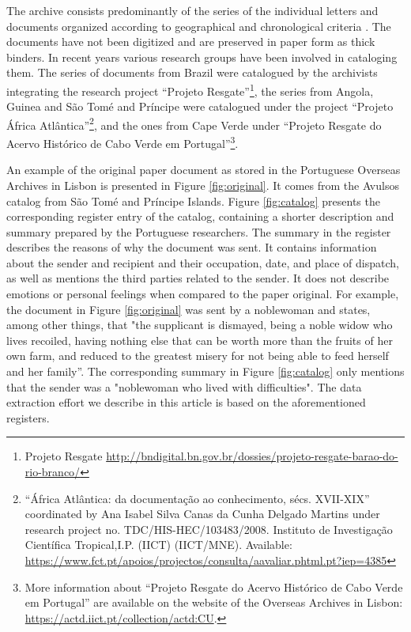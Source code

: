 \documentclass{article}
\begin{document}
The archive consists predominantly of the series of the individual letters and documents organized according to geographical and chronological criteria \cite{arquivo_historico_colonial_boletim_1950}. The documents have not been digitized and are preserved in paper form as thick binders. In recent years various research groups have been involved in cataloging them. The series of documents from Brazil were catalogued by the archivists integrating the research project ``Projeto Resgate''\footnote{Projeto Resgate \url{http://bndigital.bn.gov.br/dossies/projeto-resgate-barao-do-rio-branco/}}, the series from Angola, Guinea and São Tomé and Príncipe were catalogued under the project ``Projeto África Atlântica''\footnote{``África Atlântica: da documentação ao conhecimento, sécs. XVII-XIX'' coordinated by Ana Isabel Silva Canas da Cunha Delgado Martins under research project no. TDC/HIS-HEC/103483/2008. Instituto de Investigação Científica Tropical,I.P. (IICT) (IICT/MNE).  Available: \url{https://www.fct.pt/apoios/projectos/consulta/aavaliar.phtml.pt?iep=4385}}, and the ones from Cape Verde under ``Projeto Resgate do Acervo Histórico de Cabo Verde em Portugal''\footnote{More information about ``Projeto Resgate do Acervo Histórico de Cabo Verde em Portugal'' are available on the website of the Overseas Archives in Lisbon: \url{https://actd.iict.pt/collection/actd:CU}.}.

An example of the original paper document as stored in the Portuguese Overseas Archives in Lisbon is presented in Figure \ref{fig:original}. It comes from the Avulsos catalog from São Tomé and Príncipe Islands. Figure \ref{fig:catalog} presents the corresponding register entry of the catalog, containing a shorter description and summary prepared by the Portuguese researchers. The summary in the register describes the reasons of why the document was sent. It contains information about the sender and recipient and their occupation, date, and place of dispatch, as well as mentions the third parties related to the sender. It does not describe emotions or personal feelings when compared to the paper original. For example, the document in Figure \ref{fig:original} was sent by a noblewoman and states, among other things, that "the supplicant is dismayed, being a noble widow who lives recoiled, having nothing else that can be worth more than the fruits of her own farm, and reduced to the greatest misery for not being able to feed herself and her family”. The corresponding summary in Figure \ref{fig:catalog} only mentions that the sender was a "noblewoman who lived with difficulties". The data extraction effort we describe in this article is based on the aforementioned registers.
\end{document}
